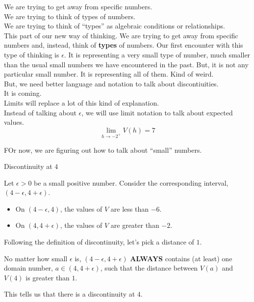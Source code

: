 \documentclass{ximera}
\begin{document}
\begin{idea}


We are trying to get away from specific numbers. \\

We are trying to think of types of numbers. \\

We are trying to think of ``types'' as algebraic conditions or relationships. \\


This part of our new way of thinking.  We are trying to get away from specific numbers and, instead, think of \textbf{types} of numbers.  Our first encounter with this type of thinking is $\epsilon$.  It is representing a very small type of number, much smaller than the usual small numbers we have encountered in the past.  But, it is not any particular small number.  It is representing all of them. Kind of weird. \\


But, we need better language and notation to talk about discontiuities. \\

It is coming. \\

Limits will replace a lot of this kind of explanation. \\

Instead of talking about $\epsilon$, we will use limit notation to talk about expected values. \\

\[
\lim\limits_{h \to -2^+} V(h) = 7
\]

FOr now, we are figuring out how to talk about ``small'' numbers. \\

\end{idea}









\begin{explanation} Discontinuity at $4$


Let $\epsilon > 0$ be a small positive number.  Consider the corresponding interval, $(4 - \epsilon, 4 + \epsilon)$.

\begin{itemize}
\item On $(4 - \epsilon, 4)$, the values of $V$ are less than $-6$.
\item On $(4, 4 + \epsilon)$, the values of $V$ are greater than $-2$.
\end{itemize}


Following the definition of discontinuity, let's pick a distance of $1$.


No matter how small $\epsilon$ is, $(4 - \epsilon, 4 + \epsilon)$ \textbf{\textcolor{red!90!darkgray}{ALWAYS}} contains (at least) one domain number, $a \in (4, 4 + \epsilon)$, such that the distance between $V(a)$ and $V(4)$ is greater than $1$.

This tells us that there is a discontinuity at $4$.

\end{explanation}
\end{document}
